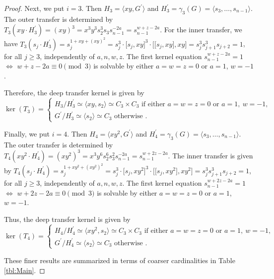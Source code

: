 \documentclass{amsart}
\theoremstyle{definition}
\numberwithin{equation}{section}
\begin{document}
\begin{proof}
Next, we put \(i=3\).
Then \(H_3=\langle xy,G^\prime\rangle\) and \(H_3^\prime=\gamma_3(G)=\langle s_3,\ldots,s_{n-1}\rangle\).
The outer transfer is determined by \(T_3(xy\cdot H_3^\prime)=(xy)^3=x^3y^3s_2^3s_3s_{n-1}^{-2a}=s_{n-1}^{w+z-2a}\).
For the inner transfer, we have
\(T_3(s_j\cdot H_3^\prime)=s_j^{1+xy+(xy)^2}=s_j^3\cdot\lbrack s_j,xy\rbrack^3\cdot\lbrack\lbrack s_j,xy\rbrack,xy\rbrack=s_j^3s_{j+1}^3s_{j+2}=1\),
for all \(j\ge 3\), independently of \(a,n,w,z\).
The first kernel equation \(s_{n-1}^{w+z-2a}=1\) \(\Longleftrightarrow\) \(w+z-2a\equiv 0\pmod{3}\) is solvable by
either \(a=w=z=0\)
or \(a=1\), \(w=-1\).

Therefore, the deep transfer kernel is given by
\begin{equation}
\label{eqn:dTKT3}
\ker(T_3)=
\begin{cases}
H_3/H_3^\prime\simeq\langle xy,s_2\rangle\simeq C_3\times C_3 \text{ if either } a=w=z=0 \text{ or } a=1,\ w=-1, \\
G^\prime/H_3^\prime\simeq\langle s_2\rangle\simeq C_3 \text{ otherwise }.
\end{cases}
\end{equation}

Finally, we put \(i=4\).
Then \(H_4=\langle xy^2,G^\prime\rangle\) and \(H_4^\prime=\gamma_3(G)=\langle s_3,\ldots,s_{n-1}\rangle\).
The outer transfer is determined by \(T_4(xy^2\cdot H_4^\prime)=(xy^2)^3=x^3y^6s_2^6s_3^2s_{n-1}^{-2a}=s_{n-1}^{w+2z-2a}\).
The inner transfer is given by
\(T_4(s_j\cdot H_4^\prime)=s_j^{1+xy^2+(xy^2)^2}=s_j^3\cdot\lbrack s_j,xy^2\rbrack^3\cdot\lbrack\lbrack s_j,xy^2\rbrack,xy^2\rbrack=s_j^3s_{j+1}^3s_{j+2}=1\),
for all \(j\ge 3\), independently of \(a,n,w,z\).
The first kernel equation \(s_{n-1}^{w+2z-2a}=1\) \(\Longleftrightarrow\) \(w+2z-2a\equiv 0\pmod{3}\) is solvable by
either \(a=w=z=0\)
or \(a=1\), \(w=-1\).

Thus, the deep transfer kernel is given by
\begin{equation}
\label{eqn:dTKT4}
\ker(T_4)=
\begin{cases}
H_4/H_4^\prime\simeq\langle xy^2,s_2\rangle\simeq C_3\times C_3 \text{ if either } a=w=z=0 \text{ or } a=1,\ w=-1, \\
G^\prime/H_4^\prime\simeq\langle s_2\rangle\simeq C_3 \text{ otherwise }.
\end{cases}
\end{equation}

These finer results are summarized in terms of coarser cardinalities in Table
\ref{tbl:Main}.
\end{proof}
\end{document}
